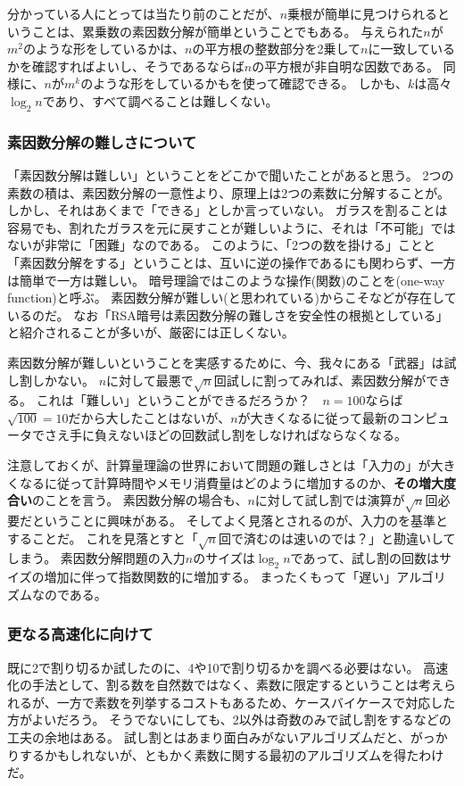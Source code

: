 分かっている人にとっては当たり前のことだが、$n$乗根が簡単に見つけられるということは、累乗数の素因数分解が簡単ということでもある。
与えられた$n$が$m^2$のような形をしているかは、$n$の平方根の整数部分を2乗して$n$に一致しているかを確認すればよいし、そうであるならば$n$の平方根が非自明な因数である。
同様に、$n$が$m^k$のような形をしているかもを使って確認できる。
しかも、$k$は高々$\log_2{n}$であり、すべて調べることは難しくない。


\subsubsection{素因数分解の難しさについて}
「素因数分解は難しい」ということをどこかで聞いたことがあると思う。
2つの素数の積は、素因数分解の一意性より、原理上は2つの素数に分解することが。
しかし、それはあくまで「できる」としか言っていない。
ガラスを割ることは容易でも、割れたガラスを元に戻すことが難しいように、それは「不可能」ではないが非常に「困難」なのである。
このように、「2つの数を掛ける」ことと「素因数分解をする」ということは、互いに逆の操作であるにも関わらず、一方は簡単で一方は難しい。
暗号理論ではこのような操作(関数)のことを(one-way function)と呼ぶ。
素因数分解が難しい(と思われている)からこそなどが存在しているのだ。
なお「RSA暗号は素因数分解の難しさを安全性の根拠としている」と紹介されることが多いが、厳密には正しくない。

素因数分解が難しいということを実感するために、今、我々にある「武器」は試し割しかない。
$n$に対して最悪で$\sqrt{n}$回試しに割ってみれば、素因数分解ができる。
これは「難しい」ということができるだろうか？　$n=100$ならば$\sqrt{100}=10$だから大したことはないが、$n$が大きくなるに従って最新のコンピュータでさえ手に負えないほどの回数試し割をしなければならなくなる。

注意しておくが、計算量理論の世界において問題の難しさとは「入力の」が大きくなるに従って計算時間やメモリ消費量はどのように増加するのか、\textbf{その増大度合い}のことを言う。
素因数分解の場合も、$n$に対して試し割では演算が$\sqrt{n}$回必要だということに興味がある。
そしてよく見落とされるのが、入力のを基準とすることだ。
これを見落とすと「$\sqrt{n}$回で済むのは速いのでは？」と勘違いしてしまう。
素因数分解問題の入力$n$のサイズは$\log_2{n}$であって、試し割の回数はサイズの増加に伴って指数関数的に増加する。
まったくもって「遅い」アルゴリズムなのである。

\subsubsection{更なる高速化に向けて}
既に2で割り切るか試したのに、4や10で割り切るかを調べる必要はない。
高速化の手法として、割る数を自然数ではなく、素数に限定するということは考えられるが、一方で素数を列挙するコストもあるため、ケースバイケースで対応した方がよいだろう。
そうでないにしても、2以外は奇数のみで試し割をするなどの工夫の余地はある。
試し割とはあまり面白みがないアルゴリズムだと、がっかりするかもしれないが、ともかく素数に関する最初のアルゴリズムを得たわけだ。

